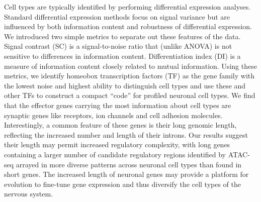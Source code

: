 Cell types are typically identified by performing differential expression analyses. Standard differential expression methods focus on signal variance but are influenced by both information content and robustness of differential expression. We introduced two simple metrics to separate out these features of the data. Signal contrast (SC) is a signal-to-noise ratio that (unlike ANOVA) is not sensitive to differences in information content. Differentiation index (DI) is a measure of information content closely related to mutual information. Using these metrics, we identify homeobox transcription factors (TF) as the gene family with the lowest noise and highest ability to distinguish cell types and use these and other TFs to construct a compact “code” for profiled neuronal cell types. We find that the effector genes carrying the most information about cell types are synaptic genes like receptors, ion channels and cell adhesion molecules. Interestingly, a common feature of these genes is their long genomic length, reflecting the increased number and length of their introns. 
Our results suggest their length may permit increased regulatory complexity, with long genes containing a larger number of candidate regulatory regions identified by ATAC-seq arrayed in more diverse patterns across neuronal cell types than found in short genes. The increased length of neuronal genes may provide a platform for evolution to fine-tune gene expression and thus diversify the cell types of the nervous system.
